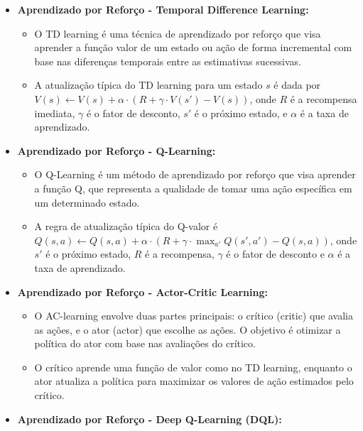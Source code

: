 \begin{itemize}
	\item \textbf{Aprendizado por Reforço - Temporal Difference Learning:}
	\begin{itemize}
		\item O TD learning é uma técnica de aprendizado por reforço que visa aprender a função valor de um estado ou ação de forma incremental com base nas diferenças temporais entre as estimativas sucessivas.
		\item A atualização típica do TD learning para um estado \(s\) é dada por \(V(s) \leftarrow V(s) + \alpha \cdot (R + \gamma \cdot V(s') - V(s))\), onde \(R\) é a recompensa imediata, \(\gamma\) é o fator de desconto, \(s'\) é o próximo estado, e \(\alpha\) é a taxa de aprendizado.
	\end{itemize}
	
	\item \textbf{Aprendizado por Reforço - Q-Learning:}
	
	\begin{itemize}
		\item O Q-Learning é um método de aprendizado por reforço que visa aprender a função Q, que representa a qualidade de tomar uma ação específica em um determinado estado.
		\item A regra de atualização típica do Q-valor é \(Q(s, a) \leftarrow Q(s, a) + \alpha \cdot (R + \gamma \cdot \max_{a'} Q(s', a') - Q(s, a))\), onde \(s'\) é o próximo estado, \(R\) é a recompensa, \(\gamma\) é o fator de desconto e \(\alpha\) é a taxa de aprendizado.
	\end{itemize}
	
	\item \textbf{Aprendizado por Reforço - Actor-Critic Learning:}
	
	\begin{itemize}
		\item O AC-learning envolve duas partes principais: o crítico (critic) que avalia as ações, e o ator (actor) que escolhe as ações. O objetivo é otimizar a política do ator com base nas avaliações do crítico.
		\item O crítico aprende uma função de valor como no TD learning, enquanto o ator atualiza a política para maximizar os valores de ação estimados pelo crítico.
	\end{itemize}
	
	\item \textbf{Aprendizado por Reforço - Deep Q-Learning (DQL):}
	

\end{itemize}
